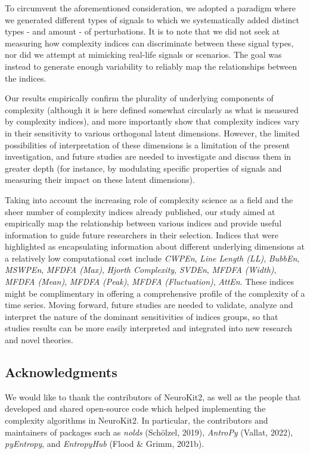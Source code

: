 \documentclass[
  man]{apa6}
\begin{document}
To circumvent the aforementioned consideration, we adopted a paradigm where we generated different types of signals to which we systematically added distinct types - and amount - of perturbations. It is to note that we did not seek at measuring how complexity indices can discriminate between these signal types, nor did we attempt at mimicking real-life signals or scenarios. The goal was instead to generate enough variability to reliably map the relationships between the indices.

Our results empirically confirm the plurality of underlying components of complexity (although it is here defined somewhat circularly as what is measured by complexity indices), and more importantly show that complexity indices vary in their sensitivity to various orthogonal latent dimensions. However, the limited possibilities of interpretation of these dimensions is a limitation of the present investigation, and future studies are needed to investigate and discuss them in greater depth (for instance, by modulating specific properties of signals and measuring their impact on these latent dimensions).

Taking into account the increasing role of complexity science as a field and the sheer number of complexity indices already published, our study aimed at empirically map the relationship between various indices and provide useful information to guide future researchers in their selection. Indices that were highlighted as encapsulating information about different underlying dimensions at a relatively low computational cost include \emph{CWPEn}, \emph{Line Length (LL)}, \emph{BubbEn}, \emph{MSWPEn}, \emph{MFDFA (Max)}, \emph{Hjorth Complexity}, \emph{SVDEn}, \emph{MFDFA (Width)}, \emph{MFDFA (Mean)}, \emph{MFDFA (Peak)}, \emph{MFDFA (Fluctuation)}, \emph{AttEn}. These indices might be complimentary in offering a comprehensive profile of the complexity of a time series. Moving forward, future studies are needed to validate, analyze and interpret the nature of the dominant sensitivities of indices groups, so that studies results can be more easily interpreted and integrated into new research and novel theories.

\hypertarget{acknowledgments}{%
\subsection{Acknowledgments}\label{acknowledgments}}

We would like to thank the contributors of NeuroKit2, as well as the people that developed and shared open-source code which helped implementing the complexity algorithms in NeuroKit2. In particular, the contributors and maintainers of packages such as \emph{nolds} (Schölzel, 2019), \emph{AntroPy} (Vallat, 2022), \emph{pyEntropy}, and \emph{EntropyHub} (Flood \& Grimm, 2021b).
\end{document}
